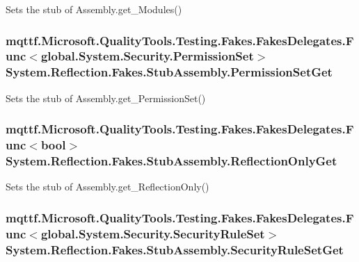 Sets the stub of Assembly.\-get\-\_\-\-Modules()

\hypertarget{class_system_1_1_reflection_1_1_fakes_1_1_stub_assembly_ab26b60412936973a9eebee4af23e0619}{
\subsubsection[{Permission\-Set\-Get}]{\setlength{\rightskip}{0pt plus 5cm}mqttf.\-Microsoft.\-Quality\-Tools.\-Testing.\-Fakes.\-Fakes\-Delegates.\-Func$<$global.\-System.\-Security.\-Permission\-Set$>$ System.\-Reflection.\-Fakes.\-Stub\-Assembly.\-Permission\-Set\-Get}}\label{class_system_1_1_reflection_1_1_fakes_1_1_stub_assembly_ab26b60412936973a9eebee4af23e0619}


Sets the stub of Assembly.\-get\-\_\-\-Permission\-Set()

\hypertarget{class_system_1_1_reflection_1_1_fakes_1_1_stub_assembly_a4cb2a533cbe9593334245bb2f478eba7}{
\subsubsection[{Reflection\-Only\-Get}]{\setlength{\rightskip}{0pt plus 5cm}mqttf.\-Microsoft.\-Quality\-Tools.\-Testing.\-Fakes.\-Fakes\-Delegates.\-Func$<$bool$>$ System.\-Reflection.\-Fakes.\-Stub\-Assembly.\-Reflection\-Only\-Get}}\label{class_system_1_1_reflection_1_1_fakes_1_1_stub_assembly_a4cb2a533cbe9593334245bb2f478eba7}


Sets the stub of Assembly.\-get\-\_\-\-Reflection\-Only()

\hypertarget{class_system_1_1_reflection_1_1_fakes_1_1_stub_assembly_a2ffb7f73debeaef0776897b4dc59c842}{
\subsubsection[{Security\-Rule\-Set\-Get}]{\setlength{\rightskip}{0pt plus 5cm}mqttf.\-Microsoft.\-Quality\-Tools.\-Testing.\-Fakes.\-Fakes\-Delegates.\-Func$<$global.\-System.\-Security.\-Security\-Rule\-Set$>$ System.\-Reflection.\-Fakes.\-Stub\-Assembly.\-Security\-Rule\-Set\-Get}}\label{class_system_1_1_reflection_1_1_fakes_1_1_stub_assembly_a2ffb7f73debeaef0776897b4dc59c842}


